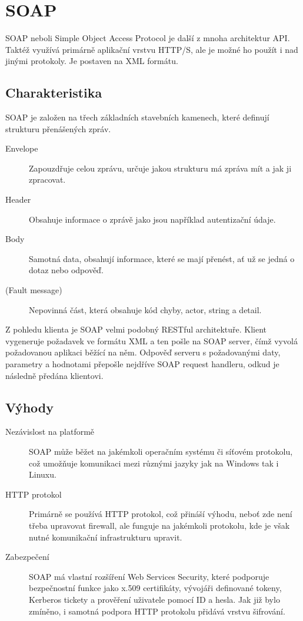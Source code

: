 \section{SOAP}
SOAP neboli Simple Object Access Protocol je další z mnoha architektur API. Taktéž využívá primárně aplikační vrstvu HTTP/S, ale je možné ho použít i nad jinými protokoly. Je postaven na XML formátu.


\subsection{Charakteristika}
SOAP je založen na třech základních stavebních kamenech, které definují strukturu přenášených zpráv.

\begin{description}
    \item[Envelope] Zapouzdřuje celou zprávu, určuje jakou strukturu má zpráva mít a jak ji zpracovat.
    \item[Header] Obsahuje informace o zprávě jako jsou například autentizační údaje.
    \item[Body] Samotná data, obsahují informace, které se mají přenést, ať už se jedná o dotaz nebo odpověď.
    \item[(Fault message)] Nepovinná část, která obsahuje kód chyby, actor, string a detail.
\end{description}

Z pohledu klienta je SOAP velmi podobný RESTful architektuře. Klient vygeneruje požadavek ve formátu XML a ten pošle na SOAP server, čímž vyvolá požadovanou aplikaci běžící na něm. Odpověď serveru s požadovanými daty, parametry a hodnotami přepošle nejdříve SOAP request handleru, odkud je následně předána klientovi.

\subsection{Výhody}
\begin{description}
    \item[Nezávislost na platformě] SOAP může běžet na jakémkoli operačním systému či síťovém protokolu, což umožňuje komunikaci mezi různými jazyky jak na Windows tak i Linuxu.
    \item[HTTP protokol] Primárně se používá HTTP protokol, což přináší výhodu, neboť zde není třeba upravovat firewall, ale funguje na jakémkoli protokolu, kde je však nutné komunikační infrastrukturu upravit.
    \item[Zabezpečení] SOAP má vlastní rozšíření Web Services Security, které podporuje bezpečnostní funkce jako x.509 certifikáty, vývojáři definované tokeny, Kerberos tickety a prověření uživatele pomocí ID a hesla. Jak již bylo zmíněno, i samotná podpora HTTP protokolu přidává vrstvu šifrování.
\end{description}

